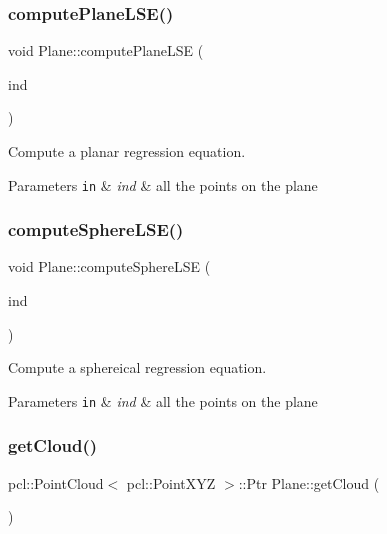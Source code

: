 \subsubsection{\texorpdfstring{compute\+Plane\+L\+S\+E()}{computePlaneLSE()}}
{\footnotesize\ttfamily void Plane\+::compute\+Plane\+L\+SE (\begin{DoxyParamCaption}\item[{pcl\+::\+Point\+Indices \&}]{ind }\end{DoxyParamCaption})\hspace{0.3cm}{\ttfamily [private]}}



Compute a planar regression equation. 


\begin{DoxyParams}[1]{Parameters}
\mbox{\tt in}  & {\em ind} & all the points on the plane \\
\hline
\end{DoxyParams}
\hypertarget{class_plane_a60923e0c6d087076a234a9d5bd45d0fa}{}\label{class_plane_a60923e0c6d087076a234a9d5bd45d0fa} 
\subsubsection{\texorpdfstring{compute\+Sphere\+L\+S\+E()}{computeSphereLSE()}}
{\footnotesize\ttfamily void Plane\+::compute\+Sphere\+L\+SE (\begin{DoxyParamCaption}\item[{pcl\+::\+Point\+Indices \&}]{ind }\end{DoxyParamCaption})\hspace{0.3cm}{\ttfamily [private]}}



Compute a sphereical regression equation. 


\begin{DoxyParams}[1]{Parameters}
\mbox{\tt in}  & {\em ind} & all the points on the plane \\
\hline
\end{DoxyParams}
\hypertarget{class_plane_a89c277f419ffb0e9d53f29127109465b}{}\label{class_plane_a89c277f419ffb0e9d53f29127109465b} 
\subsubsection{\texorpdfstring{get\+Cloud()}{getCloud()}}
{\footnotesize\ttfamily pcl\+::\+Point\+Cloud$<$ pcl\+::\+Point\+X\+YZ $>$\+::Ptr Plane\+::get\+Cloud (\begin{DoxyParamCaption}{ }\end{DoxyParamCaption})}



